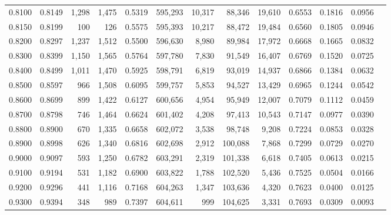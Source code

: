 \begin{tabular}{rrrrrrrrrrrrr}
0.8100 & 0.8149 &  1,298 & 1,475 &                                     0.5319 & 595,293 &  10,317 &  88,346 &  19,610 & 0.6553 & 0.1816 & 0.0956 \\
0.8150 & 0.8199 &    100 &   126 &                                     0.5575 & 595,393 &  10,217 &  88,472 &  19,484 & 0.6560 & 0.1805 & 0.0946 \\
0.8200 & 0.8297 &  1,237 & 1,512 &                                     0.5500 & 596,630 &   8,980 &  89,984 &  17,972 & 0.6668 & 0.1665 & 0.0832 \\
0.8300 & 0.8399 &  1,150 & 1,565 &                                     0.5764 & 597,780 &   7,830 &  91,549 &  16,407 & 0.6769 & 0.1520 & 0.0725 \\
0.8400 & 0.8499 &  1,011 & 1,470 &                                     0.5925 & 598,791 &   6,819 &  93,019 &  14,937 & 0.6866 & 0.1384 & 0.0632 \\
0.8500 & 0.8597 &    966 & 1,508 &                                     0.6095 & 599,757 &   5,853 &  94,527 &  13,429 & 0.6965 & 0.1244 & 0.0542 \\
0.8600 & 0.8699 &    899 & 1,422 &                                     0.6127 & 600,656 &   4,954 &  95,949 &  12,007 & 0.7079 & 0.1112 & 0.0459 \\
0.8700 & 0.8798 &    746 & 1,464 &                                     0.6624 & 601,402 &   4,208 &  97,413 &  10,543 & 0.7147 & 0.0977 & 0.0390 \\
0.8800 & 0.8900 &    670 & 1,335 &                                     0.6658 & 602,072 &   3,538 &  98,748 &   9,208 & 0.7224 & 0.0853 & 0.0328 \\
0.8900 & 0.8998 &    626 & 1,340 &                                     0.6816 & 602,698 &   2,912 & 100,088 &   7,868 & 0.7299 & 0.0729 & 0.0270 \\
0.9000 & 0.9097 &    593 & 1,250 &                                     0.6782 & 603,291 &   2,319 & 101,338 &   6,618 & 0.7405 & 0.0613 & 0.0215 \\
0.9100 & 0.9194 &    531 & 1,182 &                                     0.6900 & 603,822 &   1,788 & 102,520 &   5,436 & 0.7525 & 0.0504 & 0.0166 \\
0.9200 & 0.9296 &    441 & 1,116 &                                     0.7168 & 604,263 &   1,347 & 103,636 &   4,320 & 0.7623 & 0.0400 & 0.0125 \\
0.9300 & 0.9394 &    348 &   989 &                                     0.7397 & 604,611 &     999 & 104,625 &   3,331 & 0.7693 & 0.0309 & 0.0093 \\

\end{tabular}
